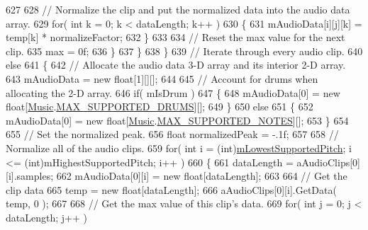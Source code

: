 \begin{DoxyCodeInclude}
{{627 
628                     \textcolor{comment}{// Normalize the clip and put the normalized data into the audio data array.}
629                     \textcolor{keywordflow}{for}( \textcolor{keywordtype}{int} k = 0; k < dataLength; k++ )
630                     \{
631                         mAudioData[i][j][k] = temp[k] * normalizeFactor;
632                     \}
633 
634                     \textcolor{comment}{// Reset the max value for the next clip.}
635                     max = 0f;
636                 \}
637             \}
638         \}
639         \textcolor{comment}{// Iterate through every audio clip.}
640         \textcolor{keywordflow}{else}
641         \{
642             \textcolor{comment}{// Allocate the audio data 3-D array and its interior 2-D array.}
643             mAudioData = \textcolor{keyword}{new} \textcolor{keywordtype}{float}[1][][];
644 
645             \textcolor{comment}{// Account for drums when allocating the 2-D array.}
646             \textcolor{keywordflow}{if}( mIsDrum )
647             \{
648                 mAudioData[0] = \textcolor{keyword}{new} \textcolor{keywordtype}{float}[\hyperlink{class_music}{Music}.\hyperlink{group___music_constants_gabce1a1ac5b9b6355af6bd7fb3868467a}{MAX\_SUPPORTED\_DRUMS}][];
649             \}
650             \textcolor{keywordflow}{else}
651             \{
652                 mAudioData[0] = \textcolor{keyword}{new} \textcolor{keywordtype}{float}[\hyperlink{class_music}{Music}.\hyperlink{group___music_constants_gaaf07da909a12e9fec0e43b70864f27b7}{MAX\_SUPPORTED\_NOTES}][];
653             \}
654 
655             \textcolor{comment}{// Set the normalized peak.}
656             \textcolor{keywordtype}{float} normalizedPeak = -.1f;
657 
658             \textcolor{comment}{// Normalize all of the audio clips.}
659             \textcolor{keywordflow}{for}( \textcolor{keywordtype}{int} i = (\textcolor{keywordtype}{int})\hyperlink{group___v_i_base_pro_var_ga3cae52b1bcc0178a8a6b03c7aaf7aac8}{mLowestSupportedPitch}; i <= (int)mHighestSupportedPitch;
       i++ )
660             \{
661                 dataLength = aAudioClips[0][i].samples;
662                 mAudioData[0][i] = \textcolor{keyword}{new} \textcolor{keywordtype}{float}[dataLength];
663 
664                 \textcolor{comment}{// Get the clip data}
665                 temp = \textcolor{keyword}{new} \textcolor{keywordtype}{float}[dataLength];
666                 aAudioClips[0][i].GetData( temp, 0 );
667 
668                 \textcolor{comment}{// Get the max value of this clip's data.}
669                 \textcolor{keywordflow}{for}( \textcolor{keywordtype}{int} j = 0; j < dataLength; j++ )
}}
\end{DoxyCodeInclude}
